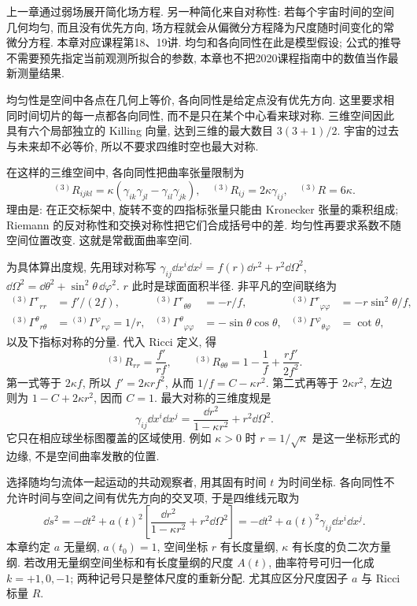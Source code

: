 \label{gr-ch-cosmology}

上一章通过弱场展开简化场方程. 另一种简化来自对称性: 若每个宇宙时间的空间几何均匀, 而且没有优先方向, 场方程就会从偏微分方程降为尺度随时间变化的常微分方程. 本章对应课程第18、19讲. 均匀和各向同性在此是模型假设; 公式的推导不需要预先指定当前观测所拟合的参数, 本章也不把2020课程指南中的数值当作最新测量结果.


均匀性是空间中各点在几何上等价, 各向同性是给定点没有优先方向. 这里要求相同时间切片的每一点都各向同性, 而不是只在某个中心看来球对称. 三维空间因此具有六个局部独立的 Killing 向量, 达到三维的最大数目 $3(3+1)/2$. 宇宙的过去与未来却不必等价, 所以不要求四维时空也最大对称.

在这样的三维空间中, 各向同性把曲率张量限制为
\begin{equation}\label{gr6-space-curvature}
 {}^{(3)}R_{ijkl}=\kappa(\gamma_{ik}\gamma_{jl}-\gamma_{il}\gamma_{jk}),
 \quad {}^{(3)}R_{ij}=2\kappa\gamma_{ij},\quad {}^{(3)}R=6\kappa.
\end{equation}
理由是: 在正交标架中, 旋转不变的四指标张量只能由 Kronecker 张量的乘积组成; Riemann 的反对称性和交换对称性把它们合成括号中的差. 均匀性再要求系数不随空间位置改变. 这就是常截面曲率空间.

为具体算出度规, 先用球对称写 $\gamma_{ij}\dd x^i\dd x^j=f(r)\dd r^2+r^2\dd\Omega^2$, $\dd\Omega^2=\dd\theta^2+\sin^2\theta\,\dd\varphi^2$. $r$ 此时是球面面积半径. 非平凡的空间联络为
\begin{align*}
 {}^{(3)}\Gamma^r{}_{rr}&=f'/(2f),&
 {}^{(3)}\Gamma^r{}_{\theta\theta}&=-r/f,&
 {}^{(3)}\Gamma^r{}_{\varphi\varphi}&=-r\sin^2\theta/f,\\
 {}^{(3)}\Gamma^\theta{}_{r\theta}&={} ^{(3)}\Gamma^\varphi{}_{r\varphi}=1/r,&
 {}^{(3)}\Gamma^\theta{}_{\varphi\varphi}&=-\sin\theta\cos\theta,&
 {}^{(3)}\Gamma^\varphi{}_{\theta\varphi}&=\cot\theta,
\end{align*}
以及下指标对称的分量. 代入 Ricci 定义, 得
\[
 {}^{(3)}R_{rr}=\frac{f'}{rf},\qquad
 {}^{(3)}R_{\theta\theta}=1-\frac1f+\frac{rf'}{2f^2}.
\]
第一式等于 $2\kappa f$, 所以 $f'=2\kappa r f^2$, 从而 $1/f=C-\kappa r^2$. 第二式再等于 $2\kappa r^2$, 左边则为 $1-C+2\kappa r^2$, 因而 $C=1$. 最大对称的三维度规是
\[
 \gamma_{ij}\dd x^i\dd x^j=\frac{\dd r^2}{1-\kappa r^2}+r^2\dd\Omega^2.
\]
它只在相应球坐标图覆盖的区域使用. 例如 $\kappa>0$ 时 $r=1/\sqrt\kappa$ 是这一坐标形式的边缘, 不是空间曲率发散的位置.

选择随均匀流体一起运动的共动观察者, 用其固有时间 $t$ 为时间坐标. 各向同性不允许时间与空间之间有优先方向的交叉项, 于是四维线元取为
\begin{equation}\label{gr6-flrw}
 \dd s^2=-\dd t^2+a(t)^2\left[\frac{\dd r^2}{1-\kappa r^2}+r^2\dd\Omega^2\right]
         =-\dd t^2+a(t)^2\gamma_{ij}\dd x^i\dd x^j.
\end{equation}
本章约定 $a$ 无量纲, $a(t_0)=1$, 空间坐标 $r$ 有长度量纲, $\kappa$ 有长度的负二次方量纲. 若改用无量纲空间坐标和有长度量纲的尺度 $A(t)$, 曲率符号可归一化成 $k=+1,0,-1$; 两种记号只是整体尺度的重新分配. 尤其应区分尺度因子 $a$ 与 Ricci 标量 $R$.

